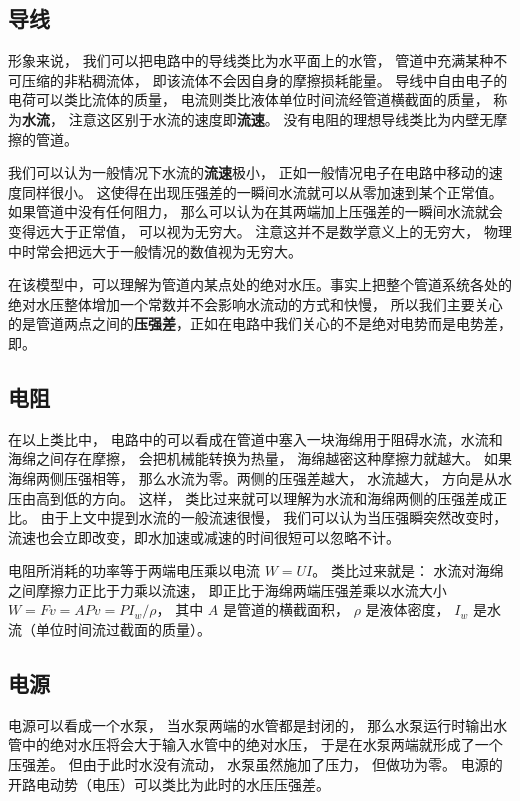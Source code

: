 
\subsection{导线}
形象来说， 我们可以把电路中的导线类比为水平面上的水管， 管道中充满某种不可压缩的非粘稠流体， 即该流体不会因自身的摩擦损耗能量。 导线中自由电子的电荷可以类比流体的质量， 电流则类比液体单位时间流经管道横截面的质量， 称为\textbf{水流}， 注意这区别于水流的速度即\textbf{流速}。 没有电阻的理想导线类比为内壁无摩擦的管道。

我们可以认为一般情况下水流的\textbf{流速}极小， 正如一般情况电子在电路中移动的速度同样很小。 这使得在出现压强差的一瞬间水流就可以从零加速到某个正常值。 如果管道中没有任何阻力， 那么可以认为在其两端加上压强差的一瞬间水流就会变得远大于正常值， 可以视为无穷大。 注意这并不是数学意义上的无穷大， 物理中时常会把远大于一般情况的数值视为无穷大。

在该模型中，可以理解为管道内某点处的绝对水压。事实上把整个管道系统各处的绝对水压整体增加一个常数并不会影响水流动的方式和快慢， 所以我们主要关心的是管道两点之间的\textbf{压强差}，正如在电路中我们关心的不是绝对电势而是电势差，即。

\subsection{电阻}
在以上类比中， 电路中的可以看成在管道中塞入一块海绵用于阻碍水流，水流和海绵之间存在摩擦， 会把机械能转换为热量， 海绵越密这种摩擦力就越大。 如果海绵两侧压强相等， 那么水流为零。两侧的压强差越大， 水流越大， 方向是从水压由高到低的方向。 这样， 类比过来就可以理解为水流和海绵两侧的压强差成正比。 由于上文中提到水流的一般流速很慢， 我们可以认为当压强瞬突然改变时，流速也会立即改变，即水加速或减速的时间很短可以忽略不计。

电阻所消耗的功率等于两端电压乘以电流 $W = UI$。 类比过来就是： 水流对海绵之间摩擦力正比于力乘以流速， 即正比于海绵两端压强差乘以水流大小 $W = F v = APv = PI_w/\rho$， 其中 $A$ 是管道的横截面积， $\rho$ 是液体密度， $I_w$ 是水流（单位时间流过截面的质量）。

\subsection{电源}
电源可以看成一个水泵， 当水泵两端的水管都是封闭的， 那么水泵运行时输出水管中的绝对水压将会大于输入水管中的绝对水压， 于是在水泵两端就形成了一个压强差。 但由于此时水没有流动， 水泵虽然施加了压力， 但做功为零。 电源的开路电动势（电压）可以类比为此时的水压压强差。

